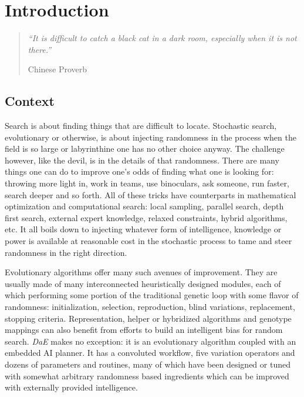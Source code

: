 \documentclass[english]{DESCARWINreport}
\begin{document}
\tableofcontents

\newpage

\chapter{Introduction}

\begin{quotation}
\emph{"`It is difficult to catch a black cat in a dark room, especially when it is not there."'}
\begin{flushright}
Chinese Proverb

\end{flushright}
\end{quotation}

\vspace{0cm}

\section{Context}

Search is about finding things that are difficult to locate. Stochastic search, evolutionary or otherwise, is about injecting randomness in the process when the field is so large or labyrinthine one has no other choice anyway. The challenge however, like the devil, is in the details of that randomness. There are many things one can do to improve one's odds of finding what one is looking for: throwing more light in, work in teams, use binoculars, ask someone, run faster, search deeper and so forth. All of these tricks have counterparts in mathematical optimization and computational search: local sampling, parallel search, depth first search, external expert knowledge, relaxed constraints, hybrid algorithms, etc. It all boils down to injecting whatever form of intelligence, knowledge or power is available at reasonable cost in the stochastic process to tame and steer randomness in the right direction.

Evolutionary algorithms offer many such avenues of improvement. They are usually made of many interconnected heuristically designed modules, each of which performing some portion of the traditional genetic loop with some flavor of randomness: initialization, selection, reproduction, blind variations, replacement, stopping criteria. Representation, helper or hybridized algorithms and genotype mappings can also benefit from efforts to build an intelligent bias for random search. \emph{DaE} makes no exception: it is an evolutionary algorithm coupled with an embedded AI planner. It has a convoluted workflow, five variation operators and dozens of parameters and routines, many of which have been designed or tuned with somewhat arbitrary randomness based ingredients which can be improved with externally provided intelligence.
\end{document}
